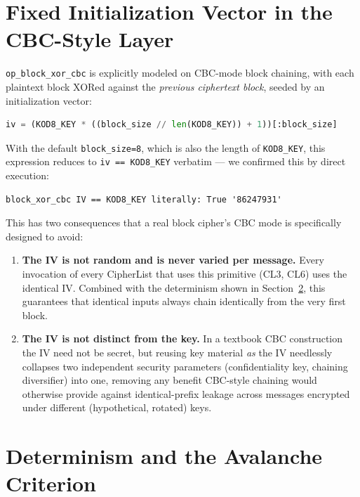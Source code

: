 \documentclass[11pt]{article}
\begin{document}
\section{Fixed Initialization Vector in the CBC-Style Layer}
\label{sec:iv}

\texttt{op\_block\_xor\_cbc} is explicitly modeled on CBC-mode block
chaining, with each plaintext block XORed against the \emph{previous
ciphertext block}, seeded by an initialization vector:

\begin{lstlisting}[language=Python]
iv = (KOD8_KEY * ((block_size // len(KOD8_KEY)) + 1))[:block_size]
\end{lstlisting}

With the default \texttt{block\_size=8}, which is also the length of
\texttt{KOD8\_KEY}, this expression reduces to \texttt{iv == KOD8\_KEY}
verbatim --- we confirmed this by direct execution:

\begin{lstlisting}
block_xor_cbc IV == KOD8_KEY literally: True '86247931'
\end{lstlisting}

This has two consequences that a real block cipher's CBC mode is
specifically designed to avoid:

\begin{enumerate}[leftmargin=1.6em]
\item \textbf{The IV is not random and is never varied per message.}
Every invocation of every CipherList that uses this primitive
(CL3, CL6) uses the identical IV. Combined with the determinism shown in
Section~\ref{sec:determinism}, this guarantees that identical inputs
always chain identically from the very first block.
\item \textbf{The IV is not distinct from the key.} In a textbook CBC
construction the IV need not be secret, but reusing key material
\emph{as} the IV needlessly collapses two independent security
parameters (confidentiality key, chaining diversifier) into one,
removing any benefit CBC-style chaining would otherwise provide against
identical-prefix leakage across messages encrypted under different
(hypothetical, rotated) keys.
\end{enumerate}

\section{Determinism and the Avalanche Criterion}
\label{sec:determinism}
\label{sec:avalanche}
\end{document}
